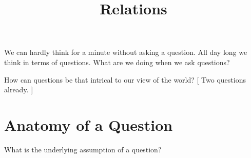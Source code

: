\documentclass{ximera}
\title{Relations}
\begin{document}
\begin{abstract}

\end{abstract}
\maketitle




We can hardly think for a minute without asking a question.  All day long we think in terms of questions. What are we doing when we ask questions? 

How can questions be that intrical to our view of the world? [ Two questions already. ] 




\section*{Anatomy of a Question}


What is the underlying assumption of a question?
\end{document}
